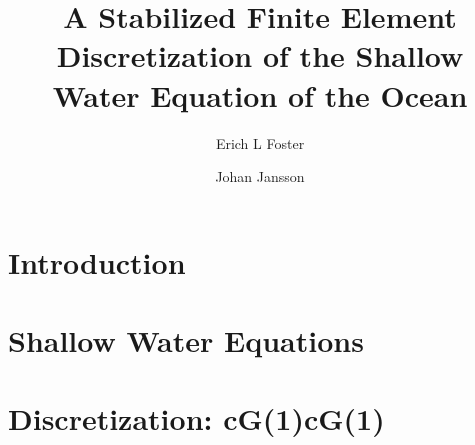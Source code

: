 \documentclass{elsarticle}
\begin{document}
  \begin{frontmatter}
    \author[1]{Erich L Foster}

    \author[1]{Johan Jansson}

    \address[1]{Basque Center for Applied Mathematics, Alameda Mazarredo, 14,
      48009 Bilbao, Basque Country -- Spain}

    \title{A Stabilized Finite Element Discretization of the Shallow Water Equation of the Ocean}

    \begin{abstract}
    \end{abstract}
  \end{frontmatter}

  \section{Introduction} \label{sec:Intro}
  

  \section{Shallow Water Equations}
  

  \section{Discretization: cG(1)cG(1)}
  

  
  
\end{document}
